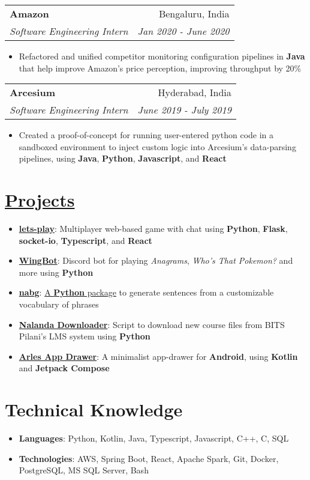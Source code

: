 \documentclass[a4paper,11pt]{article}
\makeatletter
\newcommand{\resumeItem}[2]{
  \item\small{
    \textbf{#1}{: #2 \vspace{-2pt}}
  }
}
\newcommand{\resumeItemNoTitle}[1]{
  \item\small{
    {#1 \vspace{-2pt}}
  }
}
\newcommand{\resumeSubheading}[4]{
  \vspace{2pt}
    \begin{tabular*}{\textwidth}{l@{\extracolsep{\fill}}r}
      \textbf{#1} & #2 \\
      \textit{\small#3} & \textit{\small #4} \\
    \end{tabular*}\vspace{-2pt}
}
\newcommand{\resumeItemListStart}{\begin{itemize}}
\newcommand{\resumeItemListEnd}{\end{itemize}\vspace{-2pt}}
\makeatother
\begin{document}
\resumeSubheading
{Amazon}{Bengaluru, India}
{Software Engineering Intern}{Jan 2020 - June 2020}
\resumeItemListStart
\resumeItemNoTitle{Refactored and unified competitor monitoring configuration pipelines in \textbf{Java} that help improve Amazon's price perception, improving throughput by 20\%}
\resumeItemListEnd

\resumeSubheading
{Arcesium}{Hyderabad, India}
{Software Engineering Intern}{June 2019 - July 2019}
\resumeItemListStart
\resumeItemNoTitle{Created a proof-of-concept for running user-entered python code in a sandboxed environment to inject custom logic into Arcesium's data-parsing pipelines, using \textbf{Java}, \textbf{Python}, \textbf{Javascript}, and \textbf{React}}
\resumeItemListEnd


\section{\href{https://naveen-u.github.io/projects/}{Projects}}
\resumeItemListStart
\resumeItem{\href{https://github.com/naveen-u/lets-play}{lets-play}}
{Multiplayer web-based game with chat using \textbf{Python}, \textbf{Flask}, \textbf{socket-io}, \textbf{Typescript}, and \textbf{React}}
\resumeItem{\href{https://github.com/naveen-u/WingBot}{WingBot}}
{Discord bot for playing \textit{Anagrams}, \textit{Who's That Pokemon?} and more using \textbf{Python}}
\resumeItem{\href{https://github.com/naveen-u/nabg}{nabg}}
{\href{https://pypi.org/project/nabg/}{A \textbf{Python} package} to generate sentences from a customizable vocabulary of phrases}
\resumeItem{\href{https://github.com/naveen-u/Nalanda-Downloader}{Nalanda Downloader}}
{Script to download new course files from BITS Pilani's LMS system using \textbf{Python}}
\resumeItem{\href{https://github.com/naveen-u/arles-app-drawer}{Arles App Drawer}}
{A minimalist app-drawer for \textbf{Android}, using \textbf{Kotlin} and \textbf{Jetpack Compose}}
\resumeItemListEnd

\section{Technical Knowledge}
\resumeItemListStart
\resumeItem{Languages}{Python, Kotlin, Java, Typescript, Javascript, C++, C, SQL}
\resumeItem{Technologies}{AWS, Spring Boot, React, Apache Spark, Git, Docker, PostgreSQL, MS SQL Server, Bash}
\resumeItemListEnd


\end{document}

